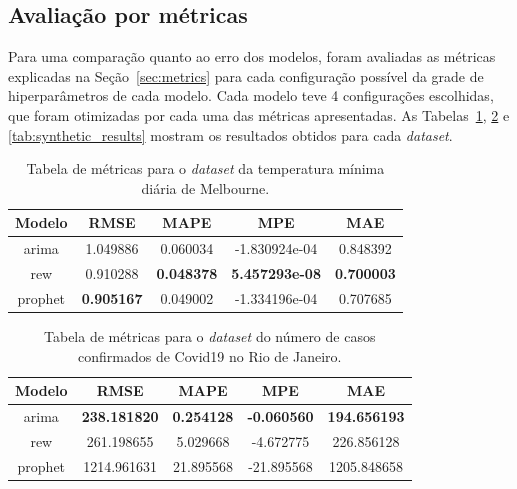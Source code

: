 \subsection{Avaliação por métricas}
Para uma comparação quanto ao erro dos modelos, foram avaliadas as métricas explicadas na Seção~\ref{sec:metrics} para cada configuração possível da grade de hiperparâmetros de cada modelo. Cada modelo teve 4 configurações escolhidas, que foram otimizadas por cada uma das métricas apresentadas. As Tabelas~\ref{tab:temperature_results}, \ref{tab:covid_results} e \ref{tab:synthetic_results} mostram os resultados obtidos para cada \textit{dataset}.

\begin{table}[!htp]
    \caption{Tabela de métricas para o \textit{dataset} da temperatura mínima diária de Melbourne.}
    \label{tab:temperature_results}
    \setlength\extrarowheight{5pt}
    \centering
    \begin{tabular}{|c|c|c|c|c|}
        \hline
        \rowcolor[HTML]{C0C0C0}
        Modelo  & RMSE              & MAPE              & MPE                   & MAE               \\ \hline
        arima   & 1.049886          & 0.060034          & -1.830924e-04         & 0.848392          \\ \hline
        \rowcolor[HTML]{EFEFEF}
        rew     & 0.910288          & \textbf{0.048378} & \textbf{5.457293e-08} & \textbf{0.700003} \\ \hline
        prophet & \textbf{0.905167} & 0.049002          & -1.334196e-04         & 0.707685          \\ \hline
    \end{tabular}
\end{table}

\begin{table}[!htp]
    \caption{Tabela de métricas para o \textit{dataset} do número de casos confirmados de Covid19 no Rio de Janeiro.}
    \label{tab:covid_results}
    \setlength\extrarowheight{5pt}
    \centering
    \begin{tabular}{|c|c|c|c|c|}
        \hline
        \rowcolor[HTML]{C0C0C0}
        Modelo  & RMSE                & MAPE              & MPE                & MAE                 \\ \hline
        arima   & \textbf{238.181820} & \textbf{0.254128} & \textbf{-0.060560} & \textbf{194.656193} \\ \hline
        \rowcolor[HTML]{EFEFEF}
        rew     & 261.198655          & 5.029668          & -4.672775          & 226.856128          \\ \hline
        prophet & 1214.961631         & 21.895568         & -21.895568         & 1205.848658         \\ \hline
    \end{tabular}
\end{table}

